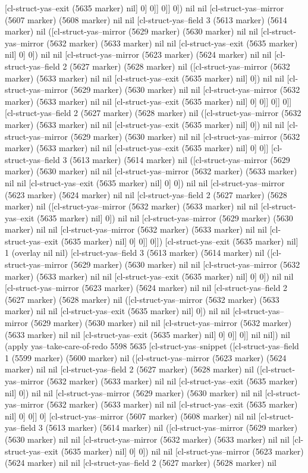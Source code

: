 [cl-struct-yas--exit (5635 marker) nil] 0] 0]] 0]] 0]) nil nil [cl-struct-yas--mirror (5607 marker) (5608 marker) nil nil [cl-struct-yas--field 3 (5613 marker) (5614 marker) nil ([cl-struct-yas--mirror (5629 marker) (5630 marker) nil nil [cl-struct-yas--mirror (5632 marker) (5633 marker) nil nil [cl-struct-yas--exit (5635 marker) nil] 0] 0]) nil nil [cl-struct-yas--mirror (5623 marker) (5624 marker) nil nil [cl-struct-yas--field 2 (5627 marker) (5628 marker) nil ([cl-struct-yas--mirror (5632 marker) (5633 marker) nil nil [cl-struct-yas--exit (5635 marker) nil] 0]) nil nil [cl-struct-yas--mirror (5629 marker) (5630 marker) nil nil [cl-struct-yas--mirror (5632 marker) (5633 marker) nil nil [cl-struct-yas--exit (5635 marker) nil] 0] 0]] 0]] 0]] [cl-struct-yas--field 2 (5627 marker) (5628 marker) nil ([cl-struct-yas--mirror (5632 marker) (5633 marker) nil nil [cl-struct-yas--exit (5635 marker) nil] 0]) nil nil [cl-struct-yas--mirror (5629 marker) (5630 marker) nil nil [cl-struct-yas--mirror (5632 marker) (5633 marker) nil nil [cl-struct-yas--exit (5635 marker) nil] 0] 0]] [cl-struct-yas--field 3 (5613 marker) (5614 marker) nil ([cl-struct-yas--mirror (5629 marker) (5630 marker) nil nil [cl-struct-yas--mirror (5632 marker) (5633 marker) nil nil [cl-struct-yas--exit (5635 marker) nil] 0] 0]) nil nil [cl-struct-yas--mirror (5623 marker) (5624 marker) nil nil [cl-struct-yas--field 2 (5627 marker) (5628 marker) nil ([cl-struct-yas--mirror (5632 marker) (5633 marker) nil nil [cl-struct-yas--exit (5635 marker) nil] 0]) nil nil [cl-struct-yas--mirror (5629 marker) (5630 marker) nil nil [cl-struct-yas--mirror (5632 marker) (5633 marker) nil nil [cl-struct-yas--exit (5635 marker) nil] 0] 0]] 0]]) [cl-struct-yas--exit (5635 marker) nil] 1 (overlay nil nil) [cl-struct-yas--field 3 (5613 marker) (5614 marker) nil ([cl-struct-yas--mirror (5629 marker) (5630 marker) nil nil [cl-struct-yas--mirror (5632 marker) (5633 marker) nil nil [cl-struct-yas--exit (5635 marker) nil] 0] 0]) nil nil [cl-struct-yas--mirror (5623 marker) (5624 marker) nil nil [cl-struct-yas--field 2 (5627 marker) (5628 marker) nil ([cl-struct-yas--mirror (5632 marker) (5633 marker) nil nil [cl-struct-yas--exit (5635 marker) nil] 0]) nil nil [cl-struct-yas--mirror (5629 marker) (5630 marker) nil nil [cl-struct-yas--mirror (5632 marker) (5633 marker) nil nil [cl-struct-yas--exit (5635 marker) nil] 0] 0]] 0]] nil nil]) nil (apply yas--take-care-of-redo 5598 5635 [cl-struct-yas--snippet ([cl-struct-yas--field 1 (5599 marker) (5600 marker) nil ([cl-struct-yas--mirror (5623 marker) (5624 marker) nil nil [cl-struct-yas--field 2 (5627 marker) (5628 marker) nil ([cl-struct-yas--mirror (5632 marker) (5633 marker) nil nil [cl-struct-yas--exit (5635 marker) nil] 0]) nil nil [cl-struct-yas--mirror (5629 marker) (5630 marker) nil nil [cl-struct-yas--mirror (5632 marker) (5633 marker) nil nil [cl-struct-yas--exit (5635 marker) nil] 0] 0]] 0] [cl-struct-yas--mirror (5607 marker) (5608 marker) nil nil [cl-struct-yas--field 3 (5613 marker) (5614 marker) nil ([cl-struct-yas--mirror (5629 marker) (5630 marker) nil nil [cl-struct-yas--mirror (5632 marker) (5633 marker) nil nil [cl-struct-yas--exit (5635 marker) nil] 0] 0]) nil nil [cl-struct-yas--mirror (5623 marker) (5624 marker) nil nil [cl-struct-yas--field 2 (5627 marker) (5628 marker) nil 